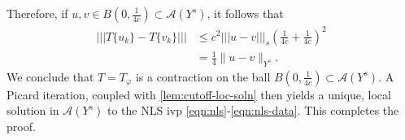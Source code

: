 \documentclass[12pt,reqno]{amsart}
\numberwithin{equation}{section}  %
\numberwithin{figure}{section}
\newcommand{\vp}{\varphi}
\theoremstyle{plain}
\theoremstyle{definition}
\theoremstyle{remark}
\begin{document}
%
%
Therefore, if $u, v \in B(0, \frac{1}{4c}) \subset \mathcal{A}(Y^s)$, it follows that
%
\begin{equation}
  \label{21a}
  \begin{split}
    |  | |T\{u_k\} - T\{v_k\} |  | |
    & \le c^2 | | |u -v |  | |_{s} \left( \frac{1}{4c} + 
    \frac{1}{4c} \right)^2
    \\
    & = \frac{1}{4} \|u -v \|_{Y^s}. 
  \end{split}
\end{equation}
%
We conclude that $T = T_{\vp}$ is a contraction on the ball $B(0, 
\frac{1}{4c}) \subset \mathcal{A}(Y^s)$. A Picard iteration, coupled with
\autoref{lem:cutoff-loc-soln} then yields a unique, local
solution in $\mathcal{A}(Y^s)$ to the NLS ivp
\eqref{eqn:nls}-\eqref{eqn:nls-data}. This completes the proof. \qquad
\qedsymbol
%
%
%
%
\end{document}
